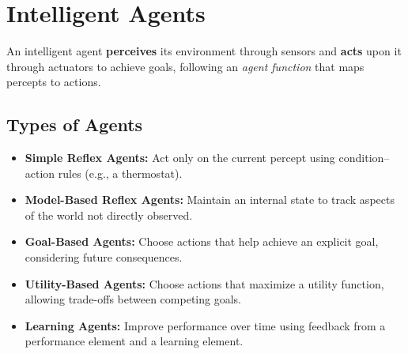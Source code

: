 \documentclass[11pt,a4paper]{article}
\begin{document}
\section{Intelligent Agents}

\begin{definitionbox}
An intelligent agent \textbf{perceives} its environment through sensors and \textbf{acts} upon it through actuators to achieve goals, following an \emph{agent function} that maps percepts to actions.
\end{definitionbox}

\begin{center}
\end{center}

\subsection{Types of Agents}
\begin{itemize}[leftmargin=*]
  \item \textbf{Simple Reflex Agents:} Act only on the current percept using condition--action rules (e.g., a thermostat).
  \item \textbf{Model-Based Reflex Agents:} Maintain an internal state to track aspects of the world not directly observed.
  \item \textbf{Goal-Based Agents:} Choose actions that help achieve an explicit goal, considering future consequences.
  \item \textbf{Utility-Based Agents:} Choose actions that maximize a utility function, allowing trade-offs between competing goals.
  \item \textbf{Learning Agents:} Improve performance over time using feedback from a performance element and a learning element.
\end{itemize}
\end{document}
